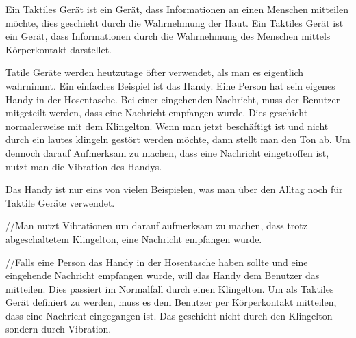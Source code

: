 
Ein Taktiles Ger{\"a}t ist ein Ger{\"a}t, dass Informationen an einen Menschen mitteilen m{\"o}chte, dies geschieht durch die Wahrnehmung der Haut. 
Ein Taktiles Ger{\"a}t ist ein Ger{\"a}t, dass Informationen durch die Wahrnehmung des Menschen mittels K{\"o}rperkontakt darstellet.  \cite{gemperle2001design}

Tatile Ger{\"a}te werden heutzutage {\"o}fter verwendet, als man es eigentlich wahrnimmt. 
Ein einfaches Beispiel ist das Handy. 
Eine Person hat sein eigenes Handy in der Hosentasche. Bei einer eingehenden Nachricht, muss der Benutzer mitgeteilt werden, dass eine Nachricht empfangen wurde.
Dies geschieht normalerweise mit dem Klingelton. Wenn man jetzt besch{\"a}ftigt ist und nicht durch ein lautes klingeln gest{\"o}rt werden m{\"o}chte, dann stellt man den Ton ab. 
Um dennoch darauf Aufmerksam zu machen, dass eine Nachricht eingetroffen ist, nutzt man die Vibration des Handys.

Das Handy ist nur eins von vielen Beispielen, was man {\"u}ber den Alltag noch f{\"u}r Taktile Ger{\"a}te verwendet.

//Man nutzt Vibrationen um darauf aufmerksam zu machen, dass trotz abgeschaltetem Klingelton, eine Nachricht empfangen wurde. 

//Falls eine Person das Handy in der Hosentasche haben sollte und eine eingehende Nachricht empfangen wurde, will das Handy dem Benutzer das mitteilen.
Dies passiert im Normalfall durch einen Klingelton. Um als Taktiles Ger{\"a}t definiert zu werden, muss es dem Benutzer per K{\"o}rperkontakt mitteilen, dass eine Nachricht eingegangen ist. 
Das geschieht nicht durch den Klingelton sondern durch Vibration. 
